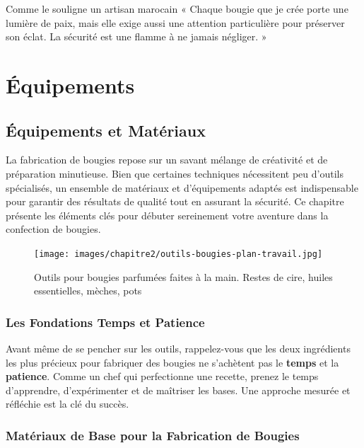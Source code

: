 \documentclass[11pt,fleqn,onecolumn,oneside]{book}
\begin{document}
\begin{example}
Comme le souligne un artisan marocain « Chaque bougie que je crée porte une lumière de paix, mais elle exige aussi une attention particulière pour préserver son éclat. La sécurité est une flamme à ne jamais négliger. »
\end{example}



\part*{Équipements}
\chapter{Équipements et Matériaux}

\begin{definition}
La fabrication de bougies repose sur un savant mélange de créativité et de préparation minutieuse. Bien que certaines techniques nécessitent peu d’outils spécialisés, un ensemble de matériaux et d’équipements adaptés est indispensable pour garantir des résultats de qualité tout en assurant la sécurité. Ce chapitre présente les éléments clés pour débuter sereinement votre aventure dans la confection de bougies.
\end{definition}

\begin{figure}[htbp]
    \centering
    \texttt{[image: images/chapitre2/outils-bougies-plan-travail.jpg]}
    \caption{Outils pour bougies parfumées faites à la main. Restes de cire, huiles essentielles, mèches, pots}
    \label{fig:image_bougie_cire_abeille}
\end{figure}


\section{Les Fondations Temps et Patience}

Avant même de se pencher sur les outils, rappelez-vous que les deux ingrédients les plus précieux pour fabriquer des bougies ne s’achètent pas le \textbf{temps} et la \textbf{patience}. Comme un chef qui perfectionne une recette, prenez le temps d’apprendre, d’expérimenter et de maîtriser les bases. Une approche mesurée et réfléchie est la clé du succès.

\section{Matériaux de Base pour la Fabrication de Bougies}
\end{document}
